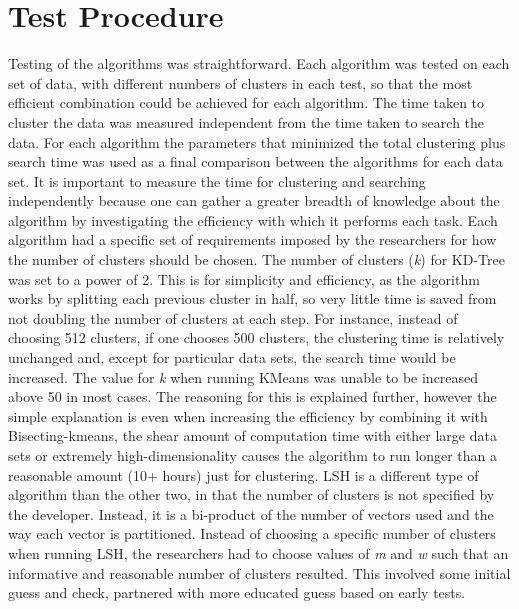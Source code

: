 \documentclass[journal]{IEEEtran}
\begin{document}
\section{Test Procedure}
Testing of the algorithms was straightforward. Each algorithm was tested on each set of data, with different numbers of clusters in each test, so that the most efficient combination could be achieved for each algorithm. The time taken to cluster the data was measured independent from the time taken to search the data. For each algorithm the parameters that minimized the total clustering plus search time was used as a final comparison between the algorithms for each data set. It is important to measure the time for clustering and searching independently because one can gather a greater breadth of knowledge about the algorithm by investigating the efficiency with which it performs each task. Each algorithm had a specific set of requirements imposed by the researchers for how the number of clusters should be chosen. The number of clusters (\textit{k}) for KD-Tree was set to a power of 2. This is for simplicity and efficiency, as the algorithm works by splitting each previous cluster in half, so very little time is saved from not doubling the number of clusters at each step. For instance, instead of choosing 512 clusters, if one chooses 500 clusters, the clustering time is relatively unchanged and, except for particular data sets, the search time would be increased. The value for \textit{k} when running KMeans was unable to be increased above 50 in most cases. The reasoning for this is explained further, however the simple explanation is even when increasing the efficiency by combining it with Bisecting-kmeans, the shear amount of computation time with either large data sets or extremely high-dimensionality causes the algorithm to run longer than a reasonable amount (10+ hours) just for clustering. LSH is a different type of algorithm than the other two, in that the number of clusters is not specified by the developer. Instead, it is a bi-product of the number of vectors used and the way each vector is partitioned. Instead of choosing a specific number of clusters when running LSH, the researchers had to choose values of \textit{m} and \textit{w} such that an informative and reasonable number of clusters resulted. This involved some initial guess and check, partnered with more educated guess based on early tests.
\end{document}
